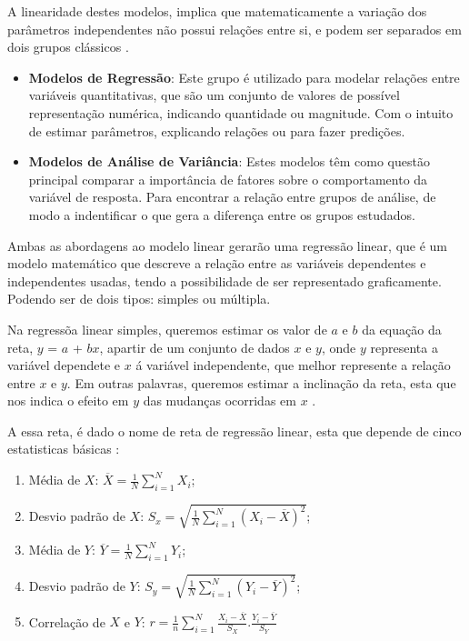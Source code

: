 \documentclass[
	12pt,				%
	openright,			%
	oneside,			%
	a4paper,			%
	english,			%
	brazil				%
	]{abntex2}
\begin{document}
A linearidade destes modelos, implica que matematicamente a variação dos parâmetros independentes não
possui relações entre si, e podem ser separados em dois grupos clássicos \cite{tipos_modelos_lineares}.
\begin{itemize}
	\item \textbf{Modelos de Regressão}:
	Este grupo é utilizado para modelar relações entre variáveis quantitativas, que são um conjunto de
	valores de possível representação numérica, indicando quantidade ou magnitude. Com o intuito de estimar
	parâmetros, explicando relações ou para fazer predições.
	\item \textbf{Modelos de Análise de Variância}:
	Estes modelos têm como questão principal comparar a importância de fatores sobre o comportamento da
	variável de resposta. Para encontrar a relação entre grupos de análise, de modo a indentificar o que
	gera a diferença entre os grupos estudados.
\end{itemize}

Ambas as abordagens ao modelo linear gerarão uma regressão linear, que é um modelo matemático que descreve 
a relação entre as variáveis dependentes e independentes usadas, tendo a possibilidade de ser representado 
graficamente. Podendo ser de dois tipos: simples ou múltipla.

Na regressõa linear simples, queremos estimar os valor de $a$ e $b$ da equação da reta, $y$ = $a$ + $bx$, 
apartir de um conjunto de dados $x$ e $y$, onde $y$ representa a variável  dependete e $x$ á variável  
independente, que melhor represente a relação entre $x$ e $y$. Em outras palavras, queremos estimar a 
inclinação da reta, esta que nos indica o efeito em $y$ das mudanças ocorridas em $x$ 
\cite{modelos_regressao_linear}.

A essa reta, é dado o nome de reta de regressão linear, esta que depende de cinco estatisticas básicas
\cite{modelos_regressao_linear}:

\begin{enumerate}
	\item Média de $X$: $\overline{X} = \frac{1}{N} \sum_{i=1}^{N} X_i$;
	\item Desvio padrão de $X$: $S_x = \sqrt{ \frac{1}{N} \sum_{i=1}^{N} (X_i - \overline{X})^2 }$;
	\item Média de $Y$: $\overline{Y} = \frac{1}{N} \sum_{i=1}^{N} Y_i$;
	\item Desvio padrão de $Y$: $S_y = \sqrt{ \frac{1}{N} \sum_{i=1}^{N} (Y_i - \overline{Y})^2 }$;
	\item Correlação de $X$ e $Y$: $r = \frac{1}{n} \sum_{i=1}^{N} \frac{X_i - \overline{X}}{S_X} . \frac{Y_i - \overline{Y}}{S_Y}$
\end{enumerate}
\end{document}
